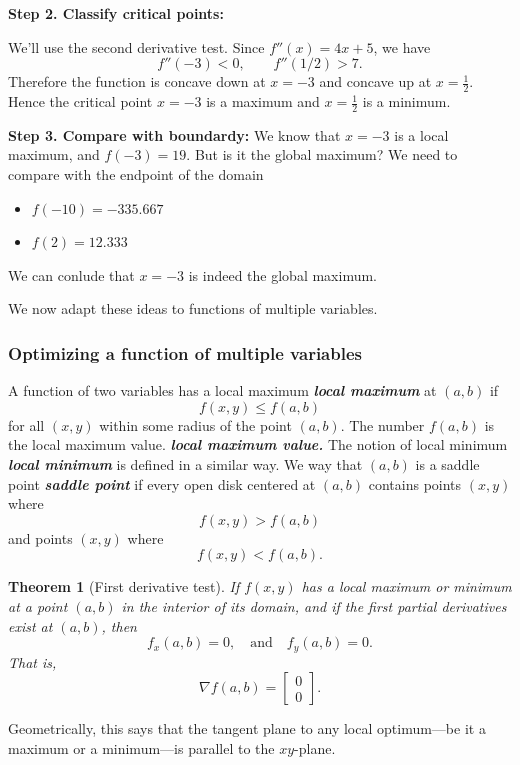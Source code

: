 \documentclass[10pt]{article}
\DeclareRobustCommand{\demph}[1]{%
  \ifmmode
  {\color{Blue}#1}%
  \else
  {\color{Blue}\bfseries\slshape #1}%
  \fi
}
\newtheorem{theorem}{Theorem}
\theoremstyle{definition}
\newcommand{\vt}{\vskip 5mm} %
\newcommand{\Fl}{\vt\noindent\textbf} %
\newcommand{\1}[1]{\textbf{1}_{\left[#1\right]}} %
\begin{document}
\Fl{Step 2. Classify critical points:}

We'll use the second derivative test. Since  $f''(x) = 4x+5$, we have
\begin{equation*}
  f''(-3) <0, \qquad f''(1/2)> 7.
\end{equation*}
Therefore the function is concave down at $x=-3$ and concave up at
$x=\frac{1}{2}$. Hence the critical point $x=-3$ is a maximum and
$x=\frac{1}{2}$ is a minimum.


\Fl{Step 3. Compare with boundardy:}
We know that $x=-3$ is a local maximum, and $f(-3) = 19$. But is it the global
maximum? We need to compare with the endpoint of the domain
\begin{itemize}
  \item $f(-10) = -335.667$
  \item $f(2) = 12.333$
\end{itemize}
We can conlude that $x=-3$ is indeed the global maximum.


We now adapt these ideas to functions of multiple variables.
\subsubsection{Optimizing a function of multiple variables}
A function of two variables has a \demph{local maximum} at $(a,b)$ if
\begin{equation*}
  f(x,y) \leq f(a,b)
\end{equation*}
for all $(x,y)$ within some radius of the point $(a,b)$. The number $f(a,b)$
is the \demph{local maximum value.} The notion of \demph{local minimum} is
defined in a similar way. We way that $(a,b)$ is a \demph{saddle point} if
every open disk centered at $(a,b)$ contains points $(x,y)$ where
\begin{equation*}
  f(x,y)>f(a,b)
\end{equation*}
and points $(x,y)$ where
\begin{equation*}
  f(x,y)<f(a,b).
\end{equation*}

\begin{theorem}[First derivative test]
  \label{thm:first-derivative-test}
  If $f(x,y)$ has a local maximum or minimum at a point $(a,b)$ in the
  interior of its domain, and if the first partial derivatives exist at
  $(a,b)$, then
  \begin{equation*}
    f_{x}(a,b)=0, \quad \text{and} \quad  f_{y}(a,b)=0.
  \end{equation*}
  That is, 
  \begin{equation*}
    \nabla f(a,b)=
    \begin{bmatrix}
      0\\0
    \end{bmatrix}.
  \end{equation*}
\end{theorem}
Geometrically, this says that the tangent plane to any local optimum---be it a
maximum or a minimum---is parallel to the $xy$-plane.
\end{document}

